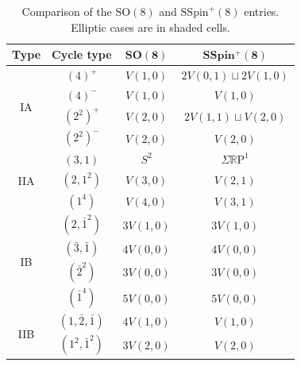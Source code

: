 \documentclass[11pt,a4paper]{article}
\renewcommand\arraystretch{1.15}
\def\SSpin{\mathrm{SSpin}}
\def\SO{\mathrm{SO}}
\def\SSpin{\mathrm{SSpin}}
\def\R{\mathbb{R}}
\def\RP{\R\mathrm{P}}
\begin{document}
\begin{table}[h]
\centering
\renewcommand{\arraystretch}{1.35}
\setlength{\tabcolsep}{6pt}

\begin{tabular}{|c|c|c|c|}
\hline
\textbf{Type} &
\textbf{Cycle type} &
$\mathbf{SO(8)}$ &
$\mathbf{SSpin^{+}(8)}$ \\
\hline

\multirow{4}{*}{IA}
&
$(4)^{+}$
&
$V(1,0)$
&
$2V(0,1)\sqcup 2V(1,0)$
\\
\cline{2-4}

&
$(4)^{-}$
&
$V(1,0)$
&
$V(1,0)$
\\
\cline{2-4}

&
$(2^2)^{+}$
&
$V(2,0)$
&
$2V(1,1)\sqcup V(2,0)$
\\
\cline{2-4}

&
$(2^2)^{-}$
&
$V(2,0)$
&
$V(2,0)$
\\
\hline

\multirow{3}{*}{IIA}
&
$(3,1)$
&
$S^{2}$
&
$\Sigma \RP^1$
\\
\cline{2-4}

&
$(2,1^2)$
&
$V(3,0)$
&
$V(2,1)$
\\
\cline{2-4}

&
$(1^4)$
&
$V(4,0)$
&
$V(3,1)$
\\
\hline

\multirow{4}{*}{IB}
&
$(2, \bar{1}^2)$&$3V(1,0)$&$3V(1,0)$
\\
\cline{2-4}
&\cellcolor[gray]{0.9}$(\bar{3},\bar{1})$&\cellcolor[gray]{0.9}$4V(0,0)$&\cellcolor[gray]{0.9}$4V(0,0)$
\\
\cline{2-4}
&\cellcolor[gray]{0.9}$(\bar{2}^2)$&\cellcolor[gray]{0.9}$3V(0,0)$&\cellcolor[gray]{0.9}$3V(0,0)$
\\
\cline{2-4}
&\cellcolor[gray]{0.9}$(\bar{1}^4)$&\cellcolor[gray]{0.9}$5V(0,0)$&\cellcolor[gray]{0.9}$5V(0,0)$
\\
\hline

\multirow{2}{*}{IIB}
&
$(1, \bar{2},\bar{1})$
&
$4V(1,0)$
&
$V(1,0)$
\\
\cline{2-4}

&
$(1^2, \bar{1}^2)$
&
$3V(2,0)$
&
$V(2,0)$
\\
\hline

\end{tabular}

\bigskip

\caption{\label{table:D4}
Comparison of the $\SO(8)$ and $\SSpin^{+}(8)$ entries. Elliptic cases are in shaded cells. }
\end{table}
\end{document}
